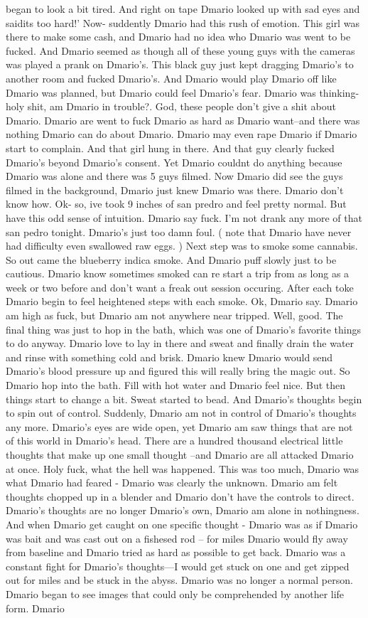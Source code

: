 \documentclass[12pt]{book}
\begin{document}
began to look a bit tired. And right on tape Dmario looked up with sad eyes and saidits too hard!' Now- suddently Dmario had this rush of emotion. This girl was there to make some cash, and Dmario had no idea who Dmario was went to be fucked. And Dmario seemed as though all of these young guys with the cameras was played a prank on Dmario's. This black guy just kept dragging Dmario's to another room and fucked Dmario's. And Dmario would play Dmario off like Dmario was planned, but Dmario could feel Dmario's fear. Dmario was thinking- holy shit, am Dmario in trouble?. God, these people don't give a shit about Dmario. Dmario are went to fuck Dmario as hard as Dmario want--and there was nothing Dmario can do about Dmario. Dmario may even rape Dmario if Dmario start to complain. And that girl hung in there. And that guy clearly fucked Dmario's beyond Dmario's consent. Yet Dmario couldnt do anything because Dmario was alone and there was 5 guys filmed. Now Dmario did see the guys filmed in the background, Dmario just knew Dmario was there. Dmario don't know how. Ok- so, ive took 9 inches of san predro and feel pretty normal. But have this odd sense of intuition. Dmario say fuck. I'm not drank any more of that san pedro tonight. Dmario's just too damn foul. ( note that Dmario have never had difficulty even swallowed raw eggs. ) Next step was to smoke some cannabis. So out came the blueberry indica smoke. And Dmario puff slowly just to be cautious. Dmario know sometimes smoked can re start a trip from as long as a week or two before and don't want a freak out session occuring. After each toke Dmario begin to feel heightened steps with each smoke. Ok, Dmario say. Dmario am high as fuck, but Dmario am not anywhere near tripped. Well, good. The final thing was just to hop in the bath, which was one of Dmario's favorite things to do anyway. Dmario love to lay in there and sweat and finally drain the water and rinse with something cold and brisk. Dmario knew Dmario would send Dmario's blood pressure up and figured this will really bring the magic out. So Dmario hop into the bath. Fill with hot water and Dmario feel nice. But then things start to change a bit. Sweat started to bead. And Dmario's thoughts begin to spin out of control. Suddenly, Dmario am not in control of Dmario's thoughts any more. Dmario's eyes are wide open, yet Dmario am saw things that are not of this world in Dmario's head. There are a hundred thousand electrical little thoughts that make up one small thought --and Dmario are all attacked Dmario at once. Holy fuck, what the hell was happened. This was too much, Dmario was what Dmario had feared - Dmario was clearly the unknown. Dmario am felt thoughts chopped up in a blender and Dmario don't have the controls to direct. Dmario's thoughts are no longer Dmario's own, Dmario am alone in nothingness. And when Dmario get caught on one specific thought - Dmario was as if Dmario was bait and was cast out on a fishesed rod -- for miles Dmario would fly away from baseline and Dmario tried as hard as possible to get back. Dmario was a constant fight for Dmario's thoughts---I would get stuck on one and get zipped out for miles and be stuck in the abyss. Dmario was no longer a normal person. Dmario began to see images that could only be comprehended by another life form. Dmario 
\end{document}
